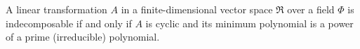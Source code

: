 A linear transformation $A$ in a finite-dimensional vector space $\mathfrak{R}$ over a field $\Phi$ is indecomposable if and only if $A$ is cyclic and its minimum polynomial is a power of a prime (irreducible) polynomial.
